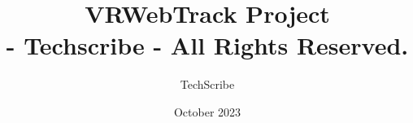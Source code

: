 \documentclass{book}
\begin{document}
\author{TechScribe}
\title{VRWebTrack Project\\
   	   \large \textbf{ - Techscribe - All Rights Reserved. }}
\date{October 2023}

\frontmatter

\maketitle
\newpage

\tableofcontents

\mainmatter
%

\backmatter
\end{document}
